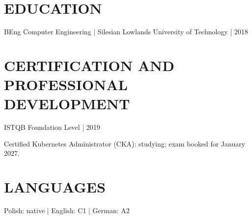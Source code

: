 \documentclass[11pt,a4paper]{article}
\newcommand{\cvsection}[1]{\section*{#1}}
\begin{document}
\cvsection{EDUCATION}
BEng Computer Engineering | Silesian Lowlands University of Technology | 2018

\cvsection{CERTIFICATION AND PROFESSIONAL DEVELOPMENT}
ISTQB Foundation Level | 2019\par
Certified Kubernetes Administrator (CKA): studying; exam booked for January 2027.

\cvsection{LANGUAGES}
Polish: native | English: C1 | German: A2
\end{document}
